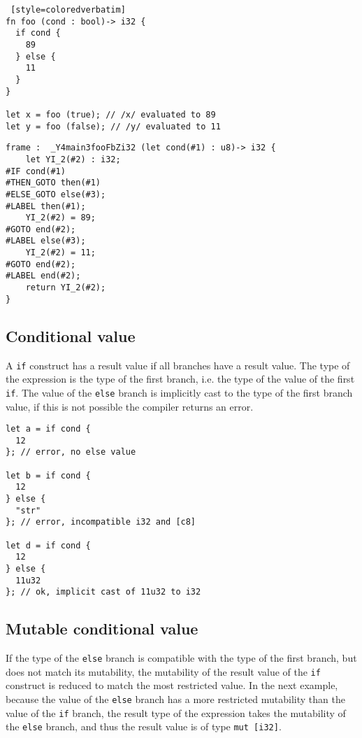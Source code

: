 \begin{lstlisting} [style=coloredverbatim]
fn foo (cond : bool)-> i32 {
  if cond {
    89
  } else {
    11
  }
}

let x = foo (true); // /x/ evaluated to 89
let y = foo (false); // /y/ evaluated to 11
\end{lstlisting}



\begin{lstlisting}[style=intermediateVerb, caption=Simple condition, label=lst:if_cond_simple]
frame :  _Y4main3fooFbZi32 (let cond(#1) : u8)-> i32 {
    let YI_2(#2) : i32;
#IF cond(#1)
#THEN_GOTO then(#1)
#ELSE_GOTO else(#3);
#LABEL then(#1);
    YI_2(#2) = 89;
#GOTO end(#2);
#LABEL else(#3);
    YI_2(#2) = 11;
#GOTO end(#2);
#LABEL end(#2);
    return YI_2(#2);
}
\end{lstlisting}



\subsection {Conditional value}

A \texttt{if} construct has a result value if all branches have a result value.
The type of the expression is the type of the first branch, i.e. the type of the
value of the first \texttt{if}. The value of the \texttt{else} branch is
implicitly cast to the type of the first branch value, if this is not possible
the compiler returns an error.

\begin{lstlisting}[style=coloredverbatim]
let a = if cond {
  12
}; // error, no else value

let b = if cond {
  12
} else {
  "str"
}; // error, incompatible i32 and [c8]

let d = if cond {
  12
} else {
  11u32
}; // ok, implicit cast of 11u32 to i32
\end{lstlisting}

\subsection{Mutable conditional value}

If the type of the \texttt{else} branch is compatible with the type of the first
branch, but does not match its mutability, the mutability of the result value of
the \texttt{if} construct is reduced to match the most restricted value. In the
next example, because the value of the \texttt{else} branch has a more
restricted mutability than the value of the \texttt{if} branch, the result type
of the expression takes the mutability of the \texttt{else} branch, and thus the
result value is of type \texttt{mut [i32]}.

